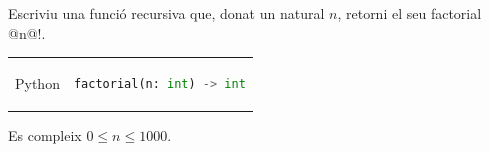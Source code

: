 
\Statement

Escriviu una funció recursiva que, donat un natural $n$, retorni el seu factorial @n@$!$.

\Interface
\begin{tabular}{rl}
Python &
\begin{lstlisting}[language=Python]
    factorial(n: int) -> int
\end{lstlisting}
\end{tabular}

\Precondition

Es compleix $0\le n \le 1000$.

\ObservationNoMain
